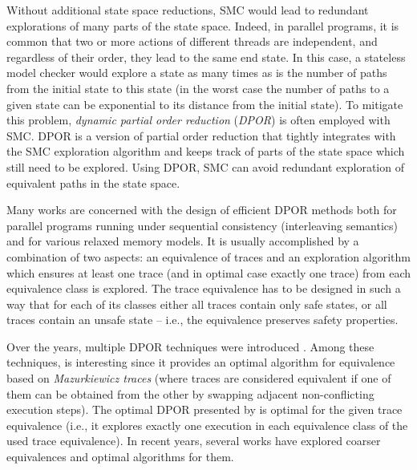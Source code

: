 Without additional state space reductions, SMC would lead to redundant
explorations of many parts of the state space.
Indeed, in parallel programs, it is common that two or more actions of
different threads are independent, and regardless of their order, they lead to
the same end state.
In this case, a stateless model checker would explore a state as many times as
is the number of paths from the initial state to this state (in the worst case
the number of paths to a given state can be exponential to its distance from
the initial state).
To mitigate this problem, \emph{dynamic partial order reduction}
(\emph{DPOR})  is often employed with SMC.
DPOR is a version of partial order reduction that tightly integrates with
the SMC exploration algorithm and keeps track of parts of the state space which
still need to be explored.
Using DPOR, SMC can avoid redundant exploration of equivalent paths in the
state space.

Many works are concerned with the design of efficient DPOR methods both for
parallel programs running under sequential consistency (interleaving
semantics) and for various relaxed memory models.
It is usually accomplished by a combination of two aspects: an equivalence of
traces and an exploration algorithm which ensures at least one trace (and in
optimal case exactly one trace) from each equivalence class is explored.
The trace equivalence has to be designed in such a way that for each of its
classes either all traces contain only safe states, or all traces contain an
unsafe state -- i.e., the equivalence preserves safety properties.

Over the years, multiple DPOR techniques were introduced
.
Among these techniques,  is interesting since it provides an optimal algorithm for equivalence based on \emph{Mazurkiewicz traces}  (where traces are considered equivalent if one of them can be obtained from the other by swapping adjacent non-conflicting execution steps).
The optimal DPOR presented by  is optimal for the
given trace equivalence (i.e., it explores exactly one execution in each equivalence class of the used trace equivalence).
In recent years, several works have explored coarser equivalences and optimal algorithms for them.

